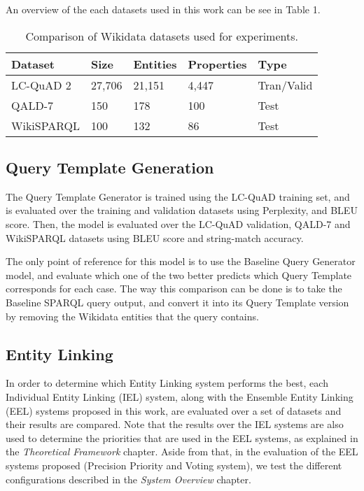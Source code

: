 An overview of the each datasets used in this work can be see in Table 1.

\begin{table}[h!]
    \centering
    \begin{tabular}{|l|l|l|l|l|}
    \hline
    \textbf{Dataset} & \textbf{Size} & \textbf{Entities} & \textbf{Properties} & \textbf{Type} \\ \hline
    LC-QuAD 2        & 27,706        & 21,151            & 4,447               & Tran/Valid    \\ \hline
    QALD-7           & 150           & 178               & 100                 & Test          \\ \hline
    WikiSPARQL       & 100           & 132               & 86                  & Test          \\ \hline
    \end{tabular}
    \caption{Comparison of Wikidata datasets used for experiments.}
    \label{table:datasetsOverview}
\end{table}

\subsection{Query Template Generation}
\label{cap4:experimentalDesign/queryTemplateGeneration}
The Query Template Generator is trained using the LC-QuAD training set, and is evaluated over 
the training and validation datasets using Perplexity, and BLEU score. Then, the model is 
evaluated over the LC-QuAD validation, QALD-7 and WikiSPARQL datasets using BLEU score and 
string-match accuracy.

The only point of reference for this model is to use the Baseline Query Generator model, and 
evaluate which one of the two better predicts which Query Template corresponds for each case. 
The way this comparison can be done is to take the Baseline SPARQL query output, and convert it 
into its Query Template version by removing the Wikidata entities that the query contains.

\subsection{Entity Linking}
\label{cap4:experimentalDesign/entityLinking}
In order to determine which Entity Linking system performs the best, each Individual Entity 
Linking (IEL) system, along with the Ensemble Entity Linking (EEL) systems proposed in this work, 
are evaluated over a set of datasets and their results are compared. Note that the results over 
the IEL systems are also used to determine the priorities that are used in the EEL systems, as 
explained in the \textit{Theoretical Framework} chapter. Aside from that, in the evaluation of 
the EEL systems proposed (Precision Priority and Voting system), we test the different 
configurations described in the \textit{System Overview} chapter. 


